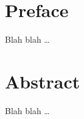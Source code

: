 
\chapter*{Preface}

Blah blah \dots

 \cleardoublepage


 \setcounter{tocdepth}{2}
 \tableofcontents

 \cleardoublepage

\chapter*{Abstract}

Blah blah \dots

 \cleardoublepage







